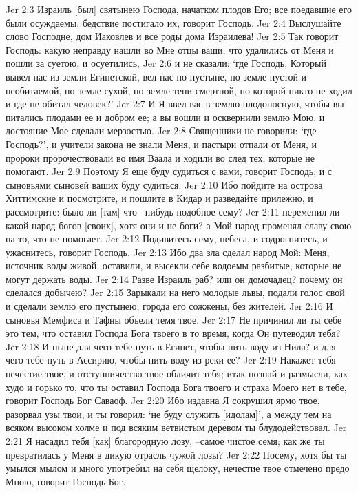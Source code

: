 Jer 2:3  Израиль [был] святынею Господа, начатком плодов Его; все поедавшие его были осуждаемы, бедствие постигало их, говорит Господь.
Jer 2:4  Выслушайте слово Господне, дом Иаковлев и все роды дома Израилева!
Jer 2:5  Так говорит Господь: какую неправду нашли во Мне отцы ваши, что удалились от Меня и пошли за суетою, и осуетились,
Jer 2:6  и не сказали: `где Господь, Который вывел нас из земли Египетской, вел нас по пустыне, по земле пустой и необитаемой, по земле сухой, по земле тени смертной, по которой никто не ходил и где не обитал человек?'
Jer 2:7  И Я ввел вас в землю плодоносную, чтобы вы питались плодами ее и добром ее; а вы вошли и осквернили землю Мою, и достояние Мое сделали мерзостью.
Jer 2:8  Священники не говорили: `где Господь?', и учители закона не знали Меня, и пастыри отпали от Меня, и пророки пророчествовали во имя Ваала и ходили во след тех, которые не помогают.
Jer 2:9  Поэтому Я еще буду судиться с вами, говорит Господь, и с сыновьями сыновей ваших буду судиться.
Jer 2:10  Ибо пойдите на острова Хиттимские и посмотрите, и пошлите в Кидар и разведайте прилежно, и рассмотрите: было ли [там] что-- нибудь подобное сему?
Jer 2:11  переменил ли какой народ богов [своих], хотя они и не боги? а Мой народ променял славу свою на то, что не помогает.
Jer 2:12  Подивитесь сему, небеса, и содрогнитесь, и ужаснитесь, говорит Господь.
Jer 2:13  Ибо два зла сделал народ Мой: Меня, источник воды живой, оставили, и высекли себе водоемы разбитые, которые не могут держать воды.
Jer 2:14  Разве Израиль раб? или он домочадец? почему он сделался добычею?
Jer 2:15  Зарыкали на него молодые львы, подали голос свой и сделали землю его пустынею; города его сожжены, без жителей.
Jer 2:16  И сыновья Мемфиса и Тафны объели темя твое.
Jer 2:17  Не причинил ли ты себе это тем, что оставил Господа Бога твоего в то время, когда Он путеводил тебя?
Jer 2:18  И ныне для чего тебе путь в Египет, чтобы пить воду из Нила? и для чего тебе путь в Ассирию, чтобы пить воду из реки ее?
Jer 2:19  Накажет тебя нечестие твое, и отступничество твое обличит тебя; итак познай и размысли, как худо и горько то, что ты оставил Господа Бога твоего и страха Моего нет в тебе, говорит Господь Бог Саваоф.
Jer 2:20  Ибо издавна Я сокрушил ярмо твое, разорвал узы твои, и ты говорил: `не буду служить [идолам]', а между тем на всяком высоком холме и под всяким ветвистым деревом ты блудодействовал.
Jer 2:21  Я насадил тебя [как] благородную лозу, --самое чистое семя; как же ты превратилась у Меня в дикую отрасль чужой лозы?
Jer 2:22  Посему, хотя бы ты умылся мылом и много употребил на себя щелоку, нечестие твое отмечено предо Мною, говорит Господь Бог.
